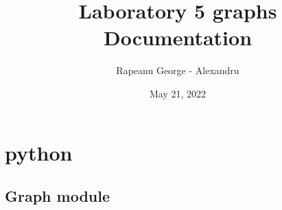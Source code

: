 \documentclass[letterpaper,10pt,english]{sphinxmanual}
\title{Laboratory 5 graphs Documentation}
\date{May 21, 2022}
\author{Rapeanu George - Alexandru}
\begin{document}
\pagestyle{empty}
\sphinxmaketitle
\pagestyle{plain}
\sphinxtableofcontents
\pagestyle{normal}
\label{\detokenize{index::doc}}



\chapter{python}
\label{\detokenize{modules:python}}\label{\detokenize{modules::doc}}

\section{Graph module}
\label{\detokenize{Graph:module-Graph}}\label{\detokenize{Graph:graph-module}}\label{\detokenize{Graph::doc}}
\end{document}
